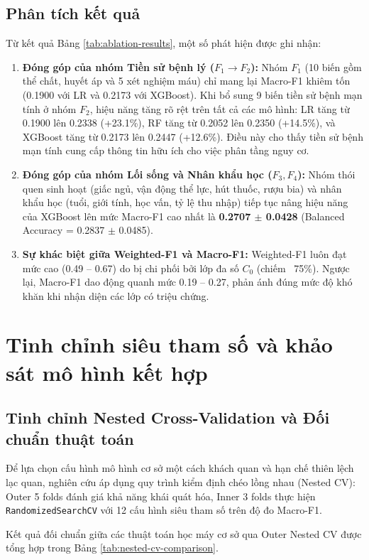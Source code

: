 \subsection{Phân tích kết quả}
Từ kết quả Bảng \ref{tab:ablation-results}, một số phát hiện được ghi nhận:
\begin{enumerate}
    \item \textbf{Đóng góp của nhóm Tiền sử bệnh lý ($F_1 \to F_2$):} Nhóm $F_1$ (10 biến gồm thể chất, huyết áp và 5 xét nghiệm máu) chỉ mang lại Macro-F1 khiêm tốn (0.1900 với LR và 0.2173 với XGBoost). Khi bổ sung 9 biến tiền sử bệnh mạn tính ở nhóm $F_2$, hiệu năng tăng rõ rệt trên tất cả các mô hình: LR tăng từ 0.1900 lên 0.2338 (+23.1\%), RF tăng từ 0.2052 lên 0.2350 (+14.5\%), và XGBoost tăng từ 0.2173 lên 0.2447 (+12.6\%). Điều này cho thấy tiền sử bệnh mạn tính cung cấp thông tin hữu ích cho việc phân tầng nguy cơ.
    \item \textbf{Đóng góp của nhóm Lối sống và Nhân khẩu học ($F_3, F_4$):} Nhóm thói quen sinh hoạt (giấc ngủ, vận động thể lực, hút thuốc, rượu bia) và nhân khẩu học (tuổi, giới tính, học vấn, tỷ lệ thu nhập) tiếp tục nâng hiệu năng của XGBoost lên mức Macro-F1 cao nhất là \textbf{0.2707 $\pm$ 0.0428} (Balanced Accuracy = 0.2837 $\pm$ 0.0485).
    \item \textbf{Sự khác biệt giữa Weighted-F1 và Macro-F1:} Weighted-F1 luôn đạt mức cao (0.49 -- 0.67) do bị chi phối bởi lớp đa số $C_0$ (chiếm ~75\%). Ngược lại, Macro-F1 dao động quanh mức 0.19 -- 0.27, phản ánh đúng mức độ khó khăn khi nhận diện các lớp có triệu chứng.
\end{enumerate}

\section{Tinh chỉnh siêu tham số và khảo sát mô hình kết hợp}
\label{sec:tuning-va-ensemble}

\subsection{Tinh chỉnh Nested Cross-Validation và Đối chuẩn thuật toán}
Để lựa chọn cấu hình mô hình cơ sở một cách khách quan và hạn chế thiên lệch lạc quan, nghiên cứu áp dụng quy trình kiểm định chéo lồng nhau (Nested CV): Outer 5 folds đánh giá khả năng khái quát hóa, Inner 3 folds thực hiện \texttt{RandomizedSearchCV} với 12 cấu hình siêu tham số trên độ đo Macro-F1.

Kết quả đối chuẩn giữa các thuật toán học máy cơ sở qua Outer Nested CV được tổng hợp trong Bảng \ref{tab:nested-cv-comparison}.

